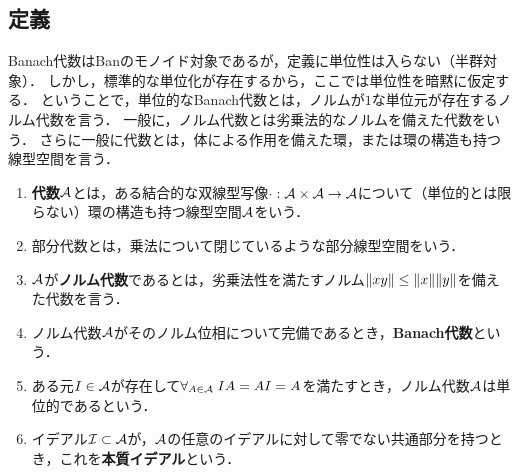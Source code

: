 \documentclass[uplatex,dvipdfmx]{jsreport}
\begin{document}
\subsection{定義}

\begin{tcolorbox}[colframe=ForestGreen, colback=ForestGreen!10!white,breakable,colbacktitle=ForestGreen!40!white,coltitle=black,fonttitle=\bfseries\sffamily,
title=]
    Banach代数はBanのモノイド対象であるが，定義に単位性は入らない（半群対象）．
    しかし，標準的な単位化が存在するから，ここでは単位性を暗黙に仮定する．
    ということで，単位的なBanach代数とは，ノルムが$1$な単位元が存在するノルム代数を言う．
    一般に，ノルム代数とは劣乗法的なノルムを備えた代数をいう．
    さらに一般に代数とは，体による作用を備えた環，または環の構造も持つ線型空間を言う．
\end{tcolorbox}

\begin{definition}\mbox{}
    \begin{enumerate}
        \item \textbf{代数}$\mathcal{A}$とは，ある結合的な双線型写像$\cdot:\mathcal{A}\times \mathcal{A}\to \mathcal{A}$について（単位的とは限らない）環の構造も持つ線型空間$\mathcal{A}$をいう．
        \item 部分代数とは，乗法について閉じているような部分線型空間をいう．
        \item $\mathcal{A}$が\textbf{ノルム代数}であるとは，劣乗法性を満たすノルム$\|xy\|\le\|x\|\|y\|$を備えた代数を言う．
        \item ノルム代数$\mathcal{A}$がそのノルム位相について完備であるとき，\textbf{Banach代数}という．
        \item ある元$I\in\mathcal{A}$が存在して$\forall_{A\in\mathcal{A}}\;IA=AI=A$を満たすとき，ノルム代数$\mathcal{A}$は単位的であるという．
        \item イデアル$\mathcal{I}\subset\mathcal{A}$が，$\mathcal{A}$の任意のイデアルに対して零でない共通部分を持つとき，これを\textbf{本質イデアル}という．
    \end{enumerate}
\end{definition}
\end{document}
